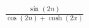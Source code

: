 \documentclass[preview]{standalone}
\begin{document}
\begin{align*}
\frac{\sin(2n)}{\cos(2n)+\cosh(2x)}
\end{align*}
\end{document}

